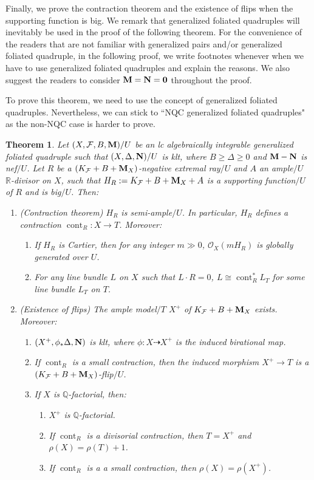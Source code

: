 \documentclass[11pt]{amsart}
\numberwithin{equation}{section}
\newcommand{\Mm}{{\bf{M}}}
\newcommand{\Nn}{{\bf{N}}}
\newcommand{\Qq}{\mathbb{Q}}
\newcommand{\Rr}{\mathbb{R}}
\newcommand{\cont}{\operatorname{cont}}
\newcommand{\Ff}{\mathcal{F}}
\newtheorem{thm}{Theorem}[section]
\theoremstyle{definition}
\theoremstyle{definition}
\theoremstyle{definition}
\begin{document}
Finally, we prove the contraction theorem and the existence of flips when the supporting function is big. We remark that generalized foliated quadruples will inevitably be used in the proof of the following theorem. For the convenience of the readers that are not familiar with generalized pairs and/or generalized foliated quadruple, in the following proof, we write footnotes whenever when we have to use generalized foliated quadruples and explain the reasons. We also suggest the readers to consider $\Mm=\Nn=\bm{0}$ throughout the proof.

To prove this theorem, we need to use the concept of generalized foliated quadruples. Nevertheless, we can stick to ``NQC generalized foliated quadruples" as the non-NQC case is harder to prove. 


\begin{thm}\label{thm: cont and flip with detail}
    Let $(X,\Ff,B,\Mm)/U$ be an lc algebraically integrable generalized foliated quadruple such that $(X,\Delta,\Nn)/U$ is klt, where $B\geq\Delta\geq 0$ and $\Mm-\Nn$ is nef$/U$. Let $R$ be a $(K_{\Ff}+B+\Mm_X)$-negative extremal ray$/U$ and $A$ an ample$/U$ $\Rr$-divisor on $X$, such that $H_R:=K_\Ff+B+\Mm_X+A$ is a supporting function$/U$ of $R$ and is big$/U$. Then:
    \begin{enumerate}
        \item (Contraction theorem) $H_R$ is semi-ample$/U$. In particular, $H_R$ defines a contraction $\cont_R: X\rightarrow T$. Moreover:
        \begin{enumerate}
            \item If $H_R$ is Cartier, then for any integer $m\gg 0$, $\mathcal{O}_X(mH_R)$ is globally generated over $U$.
            \item For any line bundle $L$ on $X$ such that $L\cdot R=0$, $L\cong\cont_R^*L_T$ for some line bundle $L_T$ on $T$.
        \end{enumerate}
        \item (Existence of flips) The ample model$/T$ $X^+$ of $K_{\Ff}+B+\Mm_X$ exists. Moreover:
        \begin{enumerate}
        \item $(X^+,\phi_*\Delta,\Nn)$ is klt, where $\phi: X\dashrightarrow X^+$ is the induced birational map.
        \item If $\cont_R$ is a small contraction, then the induced morphism $X^+\rightarrow T$ is a $(K_{\Ff}+B+\Mm_X)$-flip$/U$.
        \item If $X$ is $\Qq$-factorial, then:
        \begin{enumerate}
            \item $X^+$ is $\Qq$-factorial.
            \item If $\cont_R$ is a divisorial contraction, then $T=X^+$ and $\rho(X)=\rho(T)+1$. 
            \item If $\cont_R$ is a a small contraction, then $\rho(X)=\rho(X^+)$.
        \end{enumerate}
        \end{enumerate}
    \end{enumerate}
\end{thm}
\end{document}
